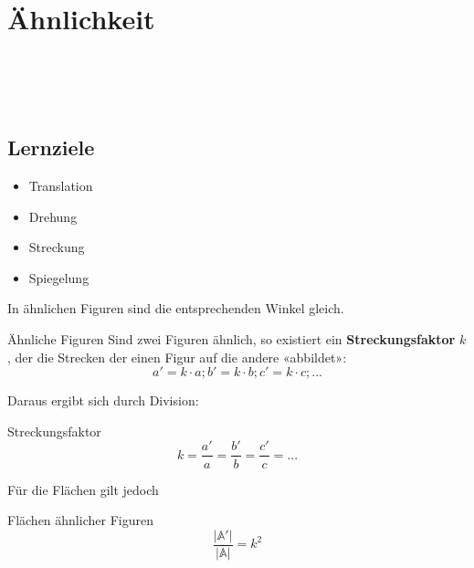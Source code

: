 
\section{Ähnlichkeit}
\\
\\
\\

\subsection*{Lernziele}

\begin{itemize}
\item Translation
\item Drehung
\item Streckung
\item Spiegelung
\end{itemize}


In ähnlichen Figuren sind die entsprechenden Winkel gleich.

\begin{definition}{Ähnliche Figuren}{}
Sind zwei Figuren ähnlich, so existiert ein \textbf{Streckungsfaktor}
$k$, der die Strecken der einen Figur auf die andere «abbildet»:
$$a' = k\cdot{}a; b' = k\cdot{}b; c' = k\cdot{} c; ...$$
\end{definition}

Daraus ergibt sich durch Division:
\begin{gesetz}{Streckungsfaktor}{}
  $$k = \frac{a'}{a} = \frac{b'}{b} = \frac{c'}{c} = ...$$
\end{gesetz}

\newpage


Für die Flächen gilt jedoch

\begin{gesetz}{Flächen ähnlicher Figuren}{}
$$\frac{|\mathbb{A'}|}{|\mathbb{A}|} = k^2$$
\end{gesetz}



